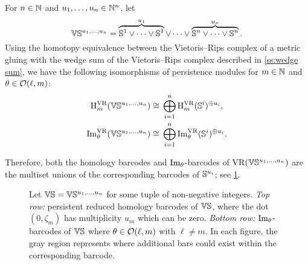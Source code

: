 \subsubsection{}

For $n \in \mathbb{N}$ and $u_1, \dots, u_n \in \mathbb{N}^n$, let
\[
\mathbb{V}\mathbb{S}^{u_1,\dots,u_n} =
\overbrace{\mathbb{S}^1\vee\dots\vee\mathbb{S}^1}^{u_1} \vee\dots\vee \overbrace{\mathbb{S}^n\vee\dots\vee\mathbb{S}^n}^{u_n}.
\]
Using the homotopy equivalence between the Vietoris--Rips complex of a metric gluing with the wedge sum of the Vietoris--Rips complex described in \cref{ss:wedge sum}, we have the following isomorphisms of persistence modules for \(m \in \mathbb{N}\) and \(\theta \in \mathcal{O}(\ell,m)\):
\[
\begin{split}
	\mathrm{H}_m^{\mathrm{VR}}(\mathbb{V}\mathbb{S}^{u_1,\dots,u_n}) &\cong \, \bigoplus_{i=1}^n \mathrm{H}_m^{\mathrm{VR}}(\mathbb{S}^i)^{\oplus u_i}, \\
	\operatorname{Im}_\theta^{\mathrm{VR}}(\mathbb{V}\mathbb{S}^{u_1,\dots,u_n}) &\cong \, \bigoplus_{i=1}^n \operatorname{Im}_\theta^{\mathrm{VR}}(\mathbb{S}^i)^{\oplus u_i}.
\end{split}
\]

Therefore, both the homology barcodes and \(\operatorname{Im}_\theta\)-barcodes of \(\mathrm{VR}(\mathbb{V}\mathbb{S}^{u_1, \dots, u_n})\) are the multiset unions of the corresponding barcodes of \(\mathbb{S}^{u_i}\); see \cref{fig:barcodes_vs}.



\begin{figure}
	\centering
	
	\caption{Let $\mathbb{V}\mathbb{S} = \mathbb{V}\mathbb{S}^{u_1,\dots,u_n}$ for some tuple of non-negative integers.
		\emph{Top row:} persistent reduced homology barcodes of $\mathbb{V}\mathbb{S}$, where the dot $(0,\zeta_m)$ has multiplicity $u_m$ which can be zero.
		\emph{Bottom row:} $\operatorname{Im}_\theta$-barcodes of $\mathbb{V}\mathbb{S}$ where $\theta \in \mathcal{O}(\ell,m)$ with \(\ell \neq m\).
        In each figure, the gray region represents where additional bars could exist within the corresponding barcode.}
	\label{fig:barcodes_vs}
\end{figure}
